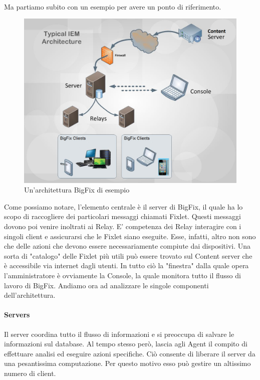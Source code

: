\paragraph{}
Ma partiamo subito con un esempio per avere un ponto di riferimento.
\begin{figure}[h!]
	\centering
	\includegraphics[width=\textwidth,keepaspectratio=true]{capitoli/imgs/IEMArchitecture.png}
	\caption{Un'architettura BigFix di esempio}
\end{figure}
Come possiamo notare, l'elemento centrale è il server di BigFix, il quale ha lo scopo di raccogliere dei particolari messaggi chiamati Fixlet. Questi messaggi dovono poi venire inoltrati ai Relay. E' competenza dei Relay interagire con i singoli client e assicurarsi che le Fixlet siano eseguite. Esse, infatti, altro non sono che delle azioni che devono essere necessariamente compiute dai dispositivi. Una sorta di "catalogo" delle Fixlet più utili può essere trovato sul Content server che è accessibile via internet dagli utenti. In tutto ciò la "finestra" dalla quale opera l'amministratore è ovviamente la Console, la quale monitora tutto il flusso di lavoro di BigFix. Andiamo ora ad analizzare le singole componenti dell'architettura.
\paragraph{Servers}
Il server coordina tutto il flusso di informazioni e si preoccupa di salvare le informazioni sul database. Al tempo stesso però, lascia agli Agent il compito di effettuare analisi ed eseguire azioni specifiche. Ciò consente di liberare il server da una pesantissima computazione. Per questo motivo esso può gestire un altissimo numero di client.
